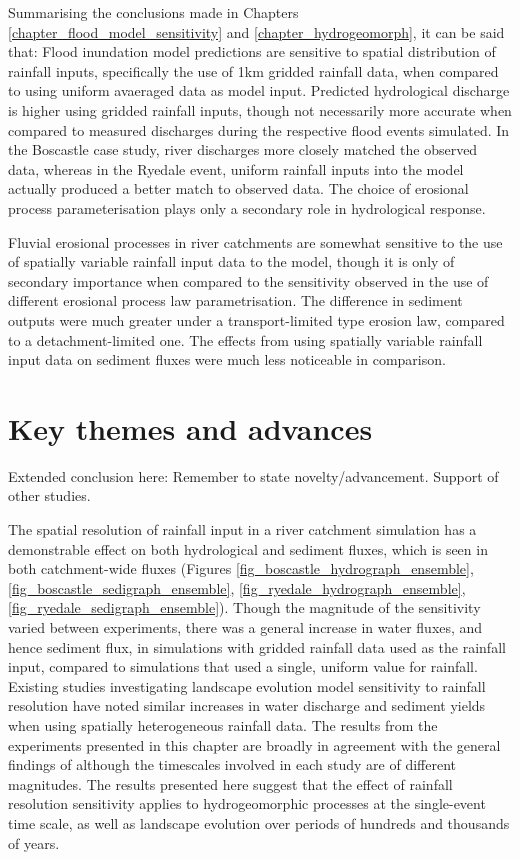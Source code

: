 Summarising the conclusions made in Chapters \ref{chapter_flood_model_sensitivity} and \ref{chapter_hydrogeomorph}, it can be said that: 
Flood inundation model predictions are sensitive to spatial distribution of rainfall inputs, specifically the use of 1km gridded rainfall data, when compared to using uniform avaeraged data as model input. Predicted hydrological discharge is higher using gridded rainfall inputs, though not necessarily more accurate when compared to measured discharges during the respective flood events simulated. In the Boscastle case study, river discharges more closely matched the observed data, whereas in the Ryedale event, uniform rainfall inputs into the model actually produced a better match to observed data. The choice of erosional process parameterisation plays only a secondary role in hydrological response. 

Fluvial erosional processes in river catchments are somewhat sensitive to the use of spatially variable rainfall input data to the model, though it is only of secondary importance when compared to the sensitivity observed in the use of different erosional process law parametrisation. The difference in sediment outputs were much greater under a transport-limited type erosion law, compared to a detachment-limited one. The effects from using spatially variable rainfall input data on sediment fluxes were much less noticeable in comparison.

\section{Key themes and advances}

Extended conclusion here: Remember to state novelty/advancement. Support of other studies. 

The spatial resolution of rainfall input in a river catchment simulation has a demonstrable effect on both hydrological and sediment fluxes, which is seen in both catchment-wide fluxes (Figures \ref{fig_boscastle_hydrograph_ensemble}, \ref{fig_boscastle_sedigraph_ensemble}, \ref{fig_ryedale_hydrograph_ensemble}, \ref{fig_ryedale_sedigraph_ensemble}). Though the magnitude of the sensitivity varied between experiments, there was a general increase in water fluxes, and hence sediment flux, in simulations with gridded rainfall data used as the rainfall input, compared to simulations that used a single, uniform value for rainfall. Existing studies investigating landscape evolution model sensitivity to rainfall resolution \citep{coulthard2016sensitivity} have noted similar increases in water discharge and sediment yields when using spatially heterogeneous rainfall data. The results from the experiments presented in this chapter are broadly in agreement with the general findings of \citet{coulthard2016sensitivity} although the timescales involved in each study are of different magnitudes. The results presented here suggest that the effect of rainfall resolution sensitivity applies to hydrogeomorphic processes at the single-event time scale, as well as landscape evolution over periods of hundreds and thousands of years.

